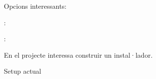 \documentclass[letterpaper,11pt,catalan]{sphinxmanual}
\begin{document}
\begin{sphinxVerbatim}[commandchars=\\\{\}]
  \PYG{p}{[}\PYG{p}{]}
\end{sphinxVerbatim}

Opcions interessants:

:

\begin{sphinxVerbatim}[commandchars=\\\{\}]
  
\end{sphinxVerbatim}

:

\begin{sphinxVerbatim}[commandchars=\\\{\}]
  
\end{sphinxVerbatim}

En el projecte interessa construir un instal·lador.

Setup actual
\end{document}
